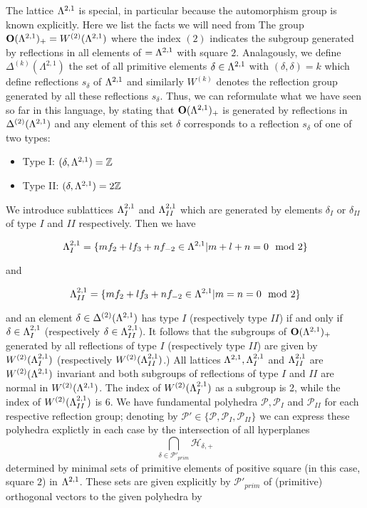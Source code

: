 \documentclass[9pt]{amsart} \usepackage[utf8]{inputenc}
\newcommand{\Z}{\mathbb{Z}} \newcommand{\C}{\mathbb{C}}
\newcommand{\Orth}{\mathbf{O}}
\newcommand{\Hpl}{\mathcal{H}}
\newcommand{\Poly}{\mathcal{P}}
\begin{document}
The lattice $\Lambda^{2,1}$ is special, in particular because the
automorphism group is known explicitly. Here we list the facts we will
need from \cite{NIKULIN:1}
The group $\Orth(\La^{2,1})_+ = W^{(2)}(\La^{2,1})$ where the index
$(2)$ indicates the subgroup generated by reflections in all elements of
$=\Lambda^{2,1}$ with square $2$. Analagously, we define
$\Delta^{(k)}(\Lambda^{2,1})$ the set of all primitive elements
$\delta \in \Lambda^{2,1}$ with $(\delta,\delta) = k$ which define
reflections $s_{\delta}$ of $\Lambda^{2,1}$ and similarly $W^{(k)}$ denotes
the reflection group generated by all these reflections $s_{\delta}$.
Thus, we can reformulate what we have seen so far in this language, by
stating that $\Orth(\La^{2,1})_+$ is generated by reflections in
$\Delta^{(2)}(\Lambda^{2,1})$ and any element of this set $\delta$
corresponds to a reflection $s_{\delta}$ of one of two types:
\begin{itemize}
\item Type I: $(\delta, \La^{2,1}) = \Z$
\item Type II: $(\delta, \La^{2,1}) = 2\Z$
\end{itemize}

We introduce sublattices $\Lambda^{2,1}_I$ and $\Lambda^{2,1}_{II}$ which are
generated by elements $\delta_I$ or $\delta_{II}$ of type $I$ and $II$
respectively. Then we have

$$\Lambda^{2,1}_I = \{m f_2 + l f_3 + n f_{-2} \in \Lambda^{2,1} | m + l + n = 0
\mod 2\}$$

and

$$\Lambda^{2,1}_{II} = \{m f_2 + l f_3 + n f_{-2} \in \Lambda^{2,1} | m = n =  0
\mod 2\}$$

and an element $\delta \in \Delta^{(2)}(\Lambda^{2,1})$ has type $I$
(respectively type $II$) if and only if $\delta \in \Lambda^{2,1}_I$
(respectively $\delta \in \Lambda^{2,1}_{II}$). It follows that the
subgroups of $\Orth(\La^{2,1})_+$ generated by all reflections of type
$I$ (respectively type $II$) are given by $W^{(2)}(\Lambda^{2,1}_I)$
(respectively $W^{(2)}(\Lambda^{2,1}_{II})$.) All lattices $\Lambda^{2,1},
 \Lambda^{2,1}_I$ and $\Lambda^{2,1}_{II}$ are $W^{(2)}(\Lambda^{2,1})$ invariant and
 both subgroups of reflections of type $I$ and $II$ are normal in
 $W^{(2)}(\Lambda^{2,1})$. The index of $W^{(2)}(\Lambda^{2,1}_I)$ as a subgroup
 is 2, while the index of $W^{(2)}(\Lambda^{2,1}_{II})$ is $6$. We have
 fundamental polyhedra $\Poly, \Poly_I$ and $\Poly_{II}$ for each
 respective reflection group; denoting by $\Poly' \in \{\Poly, \Poly_I,
 \Poly_{II}\}$ we can express these polyhedra explictly in each case by
 the intersection of all hyperplanes $$\displaystyle\bigcap_{\delta \in
 \Poly'_{prim}} \Hpl_{\delta,+}$$ determined by minimal sets of
 primitive elements of positive square (in this case, square $2$) in
 $\Lambda^{2,1}$. These sets are given explicitly by $\Poly'_{prim}$ of
 (primitive) orthogonal vectors to the given polyhedra by
\end{document}
